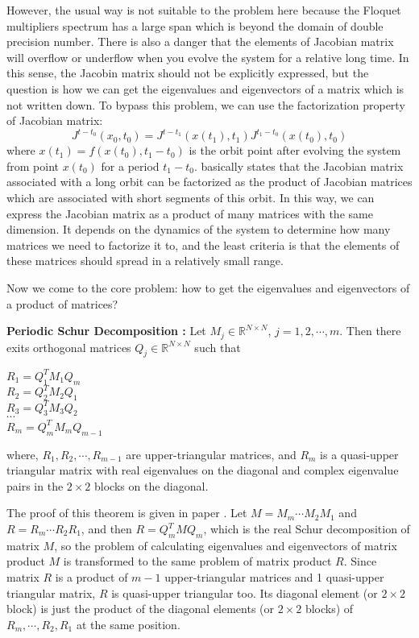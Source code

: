 		However, the usual way is not suitable to the problem here because the Floquet multipliers spectrum has
		a large span which is beyond the domain of double precision number. There is also a danger that
		the elements of Jacobian matrix will overflow or underflow when you evolve the system for
		a relative long time. In this sense, the Jacobin matrix should not be explicitly expressed, but the
		question is how we can get the eigenvalues and eigenvectors of a matrix which is not written down.
		To bypass this problem, we can use the factorization property of Jacobian matrix:
		\begin{equation}
			J^{t-t_{0}}(x_{0},t_{0})=J^{t-t_{1}}(x(t_{1}),t_{1})J^{t_{1}-t_{0}}(x(t_{0}),t_{0})
		\label{eq:xjacobian}
		\end{equation}
		where $x(t_{1})=f(x(t_{0}), t_{1}-t_{0})$ is the orbit point after evolving the system from point
		$x(t_{0})$ for a period $t_{1}-t_{0}$.  basically states that the Jacobian
		matrix associated with a long orbit can be factorized as the product of Jacobian matrices which
		are associated with short segments of this orbit. In this way, we can express the Jacobian matrix
		as a product of many matrices with the same dimension. It depends on the dynamics of the system
		to determine how many matrices we need to factorize it to, and the least criteria is that the elements
		of these matrices should spread in a relatively small range.

		Now we come to the core problem: how to get the eigenvalues and eigenvectors of a product of matrices?
		\begin{per_schur}
			\textbf{Periodic Schur Decomposition : }
			Let $M_{j}\in \mathbb{R}^{N\times N}$, $j=1,2,\cdots,m$. Then there exits orthogonal matrices
			$Q_{j}\in \mathbb{R}^{N\times N}$ such that
			\begin{center}
				$R_{1}=Q^{T}_{1}M_{1}Q_{m}$\\
				$R_{2}=Q^{T}_{2}M_{2}Q_{1}$\\
				$R_{3}=Q^{T}_{3}M_{3}Q_{2}$\\
				$\cdots$\\
				$R_{m}=Q^{T}_{m}M_{m}Q_{m-1}$\\
			\end{center}
			where, $R_{1},R_{2},\cdots, R_{m-1}$ are upper-triangular matrices, and $R_{m}$ is a quasi-upper
			triangular matrix with real eigenvalues on the diagonal and complex eigenvalue pairs in
			the $2\times 2$ blocks on the diagonal.

		\end{per_schur}
		The proof of this theorem is given in paper .
		Let $M=M_{m}\cdots M_{2}M_{1}$ and $R=R_{m}\cdots R_{2}R_{1}$, and then $R=Q^{T}_{m}MQ_{m}$, which is
		the real Schur decomposition of matrix $M$, so the problem of calculating eigenvalues and eigenvectors
		of matrix product $M$ is transformed to the same problem of matrix product $R$. Since matrix $R$ is a product
		of $m-1$ upper-triangular matrices and 1 quasi-upper triangular matrix, $R$ is quasi-upper triangular too.
		Its diagonal element (or $2\times 2$ block) is just the product of the diagonal elements (or $2\times 2$ blocks) of
		$R_{m},\cdots, R_{2},R_{1}$ at the same position.

